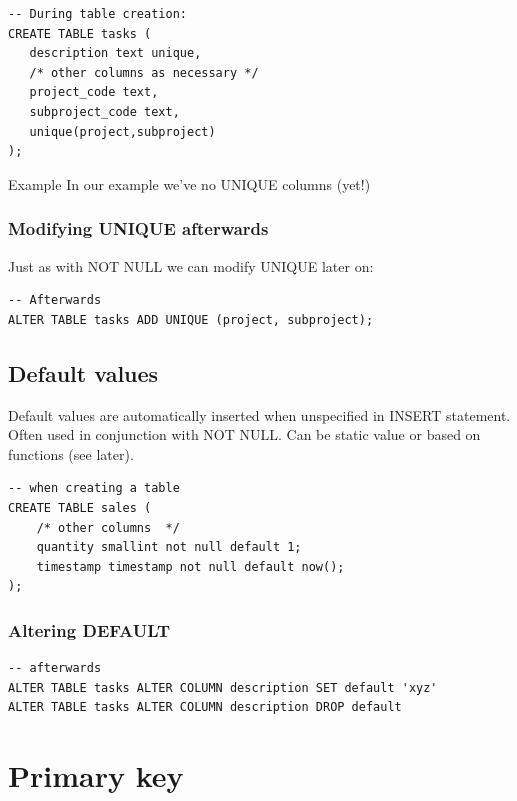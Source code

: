 \documentclass[slides]{pgnotes}
\begin{document}
\begin{verbatim}
-- During table creation:
CREATE TABLE tasks (
   description text unique,
   /* other columns as necessary */
   project_code text,
   subproject_code text,
   unique(project,subproject)
); 
\end{verbatim}

\begin{greenbox}{Example}
  In our example we've no UNIQUE columns (yet!)
\end{greenbox}

\newpage
\subsubsection{Modifying UNIQUE afterwards}

Just as with NOT NULL we can modify UNIQUE later on:

\begin{verbatim}
-- Afterwards
ALTER TABLE tasks ADD UNIQUE (project, subproject);
\end{verbatim}


\subsection{Default values}
\label{sec:default-values}

Default values are automatically inserted when unspecified in INSERT
statement.
Often used in conjunction with NOT NULL.
Can be static value or based on functions (see later).

\begin{verbatim}
-- when creating a table
CREATE TABLE sales (
    /* other columns  */
    quantity smallint not null default 1;
    timestamp timestamp not null default now(); 
);
\end{verbatim}


\newpage
\subsubsection{Altering DEFAULT}

\begin{verbatim}
-- afterwards
ALTER TABLE tasks ALTER COLUMN description SET default 'xyz'
ALTER TABLE tasks ALTER COLUMN description DROP default
\end{verbatim}


\section{Primary key}
\label{sec:primary-key}
\end{document}
